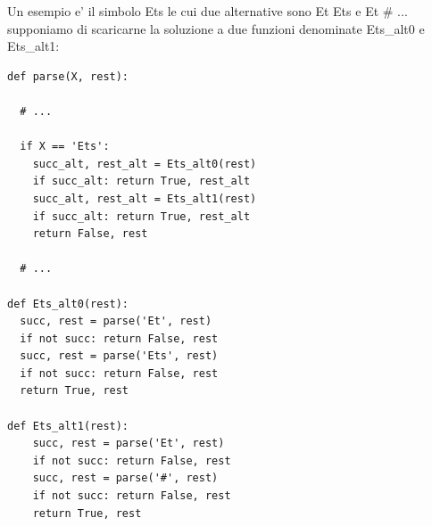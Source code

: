 Un esempio e' il simbolo Ets le cui due alternative sono Et Ets e Et \# ... supponiamo di scaricarne la soluzione a due funzioni denominate Ets\_alt0 e Ets\_alt1:
\begin{lstlisting}
def parse(X, rest):

  # ...

  if X == 'Ets':
    succ_alt, rest_alt = Ets_alt0(rest)
    if succ_alt: return True, rest_alt
    succ_alt, rest_alt = Ets_alt1(rest)
    if succ_alt: return True, rest_alt
    return False, rest

  # ...

def Ets_alt0(rest):
  succ, rest = parse('Et', rest)
  if not succ: return False, rest
  succ, rest = parse('Ets', rest)
  if not succ: return False, rest
  return True, rest

def Ets_alt1(rest):
    succ, rest = parse('Et', rest)
    if not succ: return False, rest
    succ, rest = parse('#', rest)
    if not succ: return False, rest
    return True, rest
\end{lstlisting}

